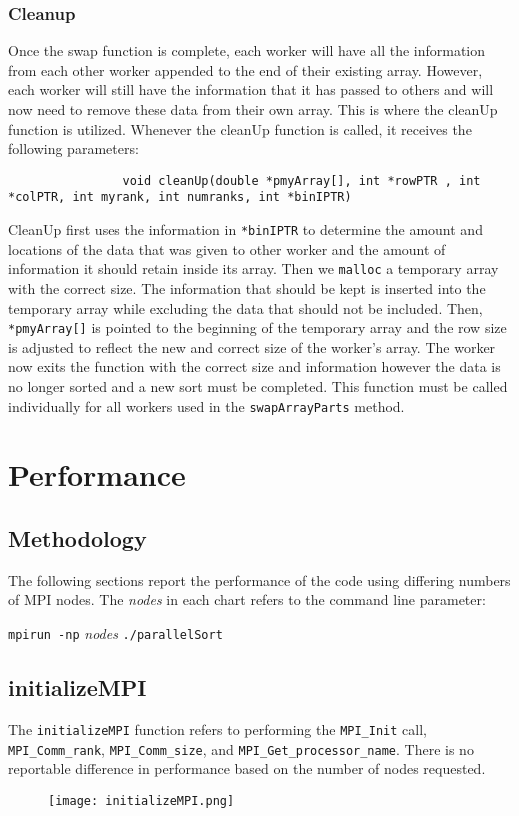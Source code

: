\documentclass{article}
\begin{document}
\subsubsection{Cleanup}
Once the swap function is complete, each worker will have all the information from each other worker appended to the end of their existing array. However, each worker will still have the information that it has passed to others and will now need to remove these data from their own array. This is where the cleanUp function is utilized. Whenever the cleanUp function is called, it receives the following parameters:
\begin{lstlisting}
                void cleanUp(double *pmyArray[], int *rowPTR , int *colPTR, int myrank, int numranks, int *binIPTR)
\end{lstlisting}
CleanUp first uses the information in \texttt{*binIPTR} to determine the amount and locations of the data that was given to other worker and the amount of information it should retain inside its array. Then we \texttt{malloc} a temporary array with the correct size. The information that should be kept is inserted into the temporary array while excluding the data that should not be included. Then, \texttt{*pmyArray[]} is pointed to the beginning of the temporary array and the row size is adjusted to reflect the new and correct size of the worker's array. The worker now exits the function with the correct size and information however the data is no longer sorted and a new sort must be completed. This function must be called individually for all workers used in the \texttt{swapArrayParts} method.


\section{Performance}
% 

\subsection{Methodology}
The following sections report the performance of the code using differing numbers of MPI nodes. The \textit{nodes} in each chart refers to the command line parameter:

\texttt{mpirun -np} \textit{nodes} \texttt{./parallelSort}

\subsection{initializeMPI}
The \texttt{initializeMPI} function refers to performing the \texttt{MPI\_Init} call, \texttt{MPI\_Comm\_rank}, \texttt{MPI\_Comm\_size}, and \texttt{MPI\_Get\_processor\_name}. There is no reportable difference in performance based on the number of nodes requested.
\begin{figure}[!htb]
	\centering
	\texttt{[image: initializeMPI.png]}
\end{figure}
\end{document}
